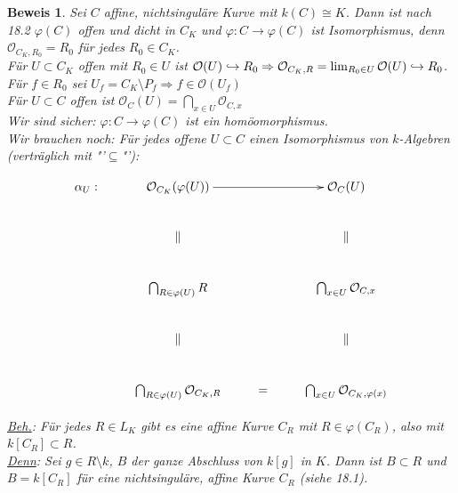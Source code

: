 \documentclass[a4paper,12pt]{report}
\theoremstyle{break}
\theoremstyle{nonumberbreak}
\theoremstyle{nonumberplain}
\newtheorem{Bew}{Beweis}
\begin{document}
\begin{Bew}
Sei $C$ affine, nichtsinguläre Kurve mit $k(C)\cong K$. Dann ist nach 18.2 $\varphi(C)$ offen und dicht in $C_K$ und $\varphi: C\rightarrow \varphi(C)$ ist Isomorphismus, denn $\mathcal O_{C_K,R_0}=R_0$ für jedes $R_0\in C_K$.\\
Für $U\subset C_K$ offen mit $R_0\in U$ ist $\mathcal O(U)\hookrightarrow R_0\\
\Rightarrow\mathcal O_{C_K,R}= \lim_{R_0\in U}\mathcal O(U)\hookrightarrow R_0$.\\
Für $f\in R_0$ sei $U_f=C_K\setminus P_f\Rightarrow f\in \mathcal O(U_f)$\\
Für $U\subset C$ offen ist $\mathcal O_C(U)=\bigcap_{x\in U}\mathcal O_{C,x}$\\
Wir sind sicher: $\varphi:C\rightarrow \varphi(C)$ ist ein homöomorphismus.\\
Wir brauchen noch: Für jedes  offene $U\subset C$ einen Isomorphismus von $k$-Algebren (verträglich mit "'$\subseteq$"'):

\[
\begin{xy}
\xymatrix{
\alpha_U:&\mathcal O_{C_K}(\varphi(U))\ar[rr]&&\mathcal O_C(U)\\
&\Vert &&\Vert\\
&\bigcap_{R\in\varphi(U)}R&&\bigcap_{x\in U}\mathcal O_{C,x}\\
&\Vert &&\Vert\\
&\bigcap_{R\in\varphi(U)}\mathcal O_{C_K,R}&=&\bigcap_{x\in U}\mathcal O_{C_K,\varphi(x)}\\
}
\end{xy}
\]

\underline{Beh.}: Für jedes $R\in L_K$ gibt es eine affine Kurve $C_R$ mit $R\in\varphi(C_R)$, also mit $k[C_R]\subset R$.\\
\underline{Denn}: Sei $g\in R\setminus k$, $B$ der ganze Abschluss von $k[g]$ in $K$. Dann ist $B\subset R$ und $B=k[C_R]$ für eine nichtsinguläre, affine Kurve $C_R$ (siehe 18.1).\\
\end{Bew}
\end{document}
